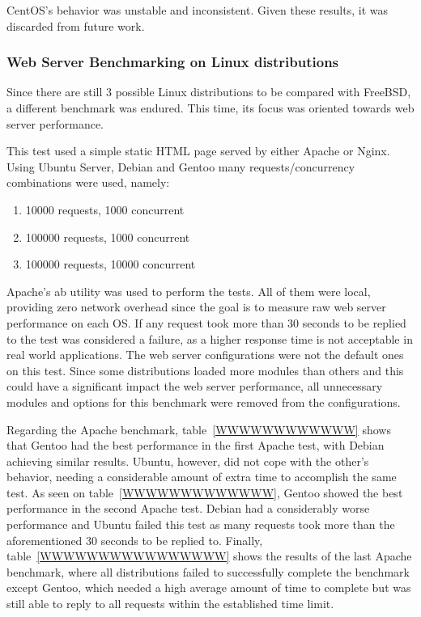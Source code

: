 CentOS's behavior was unstable and inconsistent. Given these results, it was discarded from future work.

\subsubsection{Web Server Benchmarking on Linux distributions}
Since there are still 3 possible Linux distributions to be compared with FreeBSD, a different benchmark was endured. This time, its focus was oriented towards web server performance.

This test used a simple static HTML page served by either Apache or Nginx. Using Ubuntu Server, Debian and Gentoo many requests/concurrency combinations were used, namely:
\begin{enumerate}
  \item 10000 requests, 1000 concurrent
  \item 100000 requests, 1000 concurrent
  \item 100000 requests, 10000 concurrent
\end{enumerate}
Apache's ab utility was used to perform the tests. All of them were local, providing zero network overhead since the goal is to measure raw web server performance on each OS. If any request took more than 30 seconds to be replied to the test was considered a failure, as a higher response time is not acceptable in real world applications. The web server configurations were not the default ones on this test. Since some distributions loaded more modules than others and this could have a significant impact the web server performance, all unnecessary modules and options for this benchmark were removed from the configurations.

Regarding the Apache benchmark, table~\ref{WWWWWWWWWWWW} shows that Gentoo had the best performance in the first Apache test, with Debian achieving similar results. Ubuntu, however, did not cope with the other's behavior, needing a considerable amount of extra time to accomplish the same test. As seen on table~\ref{WWWWWWWWWWWWW}, Gentoo showed the best performance in the second Apache test. Debian had a considerably worse performance and Ubuntu failed this test as many requests took more than the aforementioned 30 seconds to be replied to. Finally, table~\ref{WWWWWWWWWWWWWWWW} shows the results of the last Apache benchmark, where all distributions failed to successfully complete the benchmark except Gentoo, which needed a high average amount of time to complete but was still able to reply to all requests within the established time limit.

